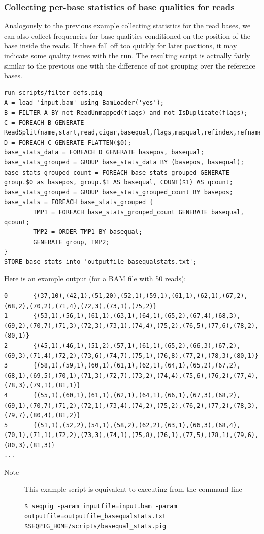 {\subsubsection{Collecting per-base statistics of base qualities for reads}
Analogously to the previous example collecting statistics for the read bases, we can also collect
frequencies for base qualities conditioned on the position of the base inside
the reads. If these fall off too quickly for later positions, it may
indicate some quality issues with the run. The resulting script is actually
fairly similar to the previous one with the difference of not grouping
over the reference bases.
\begin{lstlisting}
run scripts/filter_defs.pig
A = load 'input.bam' using BamLoader('yes');
B = FILTER A BY not ReadUnmapped(flags) and not IsDuplicate(flags);
C = FOREACH B GENERATE ReadSplit(name,start,read,cigar,basequal,flags,mapqual,refindex,refname,attributes#'MD');
D = FOREACH C GENERATE FLATTEN($0);
base_stats_data = FOREACH D GENERATE basepos, basequal;
base_stats_grouped = GROUP base_stats_data BY (basepos, basequal);
base_stats_grouped_count = FOREACH base_stats_grouped GENERATE group.$0 as basepos, group.$1 AS basequal, COUNT($1) AS qcount;
base_stats_grouped = GROUP base_stats_grouped_count BY basepos;
base_stats = FOREACH base_stats_grouped {
        TMP1 = FOREACH base_stats_grouped_count GENERATE basequal, qcount;
        TMP2 = ORDER TMP1 BY basequal;
        GENERATE group, TMP2;
}
STORE base_stats into 'outputfile_basequalstats.txt';
\end{lstlisting}
Here is an example output (for a BAM file with 50 reads):
\begin{lstlisting}
0       {(37,10),(42,1),(51,20),(52,1),(59,1),(61,1),(62,1),(67,2),(68,2),(70,2),(71,4),(72,3),(73,1),(75,2)}
1       {(53,1),(56,1),(61,1),(63,1),(64,1),(65,2),(67,4),(68,3),(69,2),(70,7),(71,3),(72,3),(73,1),(74,4),(75,2),(76,5),(77,6),(78,2),(80,1)}
2       {(45,1),(46,1),(51,2),(57,1),(61,1),(65,2),(66,3),(67,2),(69,3),(71,4),(72,2),(73,6),(74,7),(75,1),(76,8),(77,2),(78,3),(80,1)}
3       {(58,1),(59,1),(60,1),(61,1),(62,1),(64,1),(65,2),(67,2),(68,1),(69,5),(70,1),(71,3),(72,7),(73,2),(74,4),(75,6),(76,2),(77,4),(78,3),(79,1),(81,1)}
4       {(55,1),(60,1),(61,1),(62,1),(64,1),(66,1),(67,3),(68,2),(69,1),(70,7),(71,2),(72,1),(73,4),(74,2),(75,2),(76,2),(77,2),(78,3),(79,7),(80,4),(81,2)}
5       {(51,1),(52,2),(54,1),(58,2),(62,2),(63,1),(66,3),(68,4),(70,1),(71,1),(72,2),(73,3),(74,1),(75,8),(76,1),(77,5),(78,1),(79,6),(80,3),(81,3)}
...
\end{lstlisting}
\begin{description}
	\item[Note] This example script is equivalent to executing from the command line
\begin{lstlisting}
$ seqpig -param inputfile=input.bam -param outputfile=outputfile_basequalstats.txt $SEQPIG_HOME/scripts/basequal_stats.pig
\end{lstlisting}
\end{description}

}

